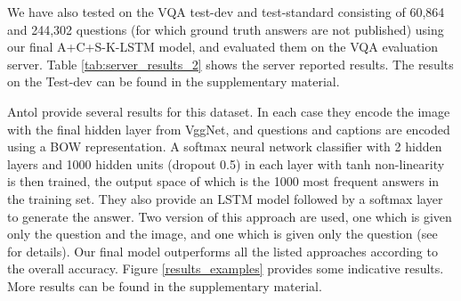 We have also tested on the VQA test-dev and test-standard consisting of 60,864 and 244,302 questions (for which ground truth answers are not published) using our final A+C+S-K-LSTM model, and evaluated them on the VQA evaluation server. Table \ref{tab:server_results_2} shows the server reported results. The results on the Test-dev can be found in the supplementary material.

Antol \etal \cite{antol2015vqa} provide several results for this dataset. In each case they encode the image with the final hidden layer from VggNet, and questions and captions are encoded using a BOW representation. A softmax neural network classifier with 2 hidden layers and 1000 hidden units (dropout 0.5) in each layer with tanh non-linearity is then trained, the output space of which is the 1000 most frequent answers in the training set. They also provide an LSTM model followed by a softmax layer to generate the answer. Two version of this approach are used, one which is given only the question and the image, and one which is given only the question (see~\cite{antol2015vqa} for details). %
Our final model outperforms all the listed approaches according to the overall accuracy. Figure \ref{results_examples} provides some indicative results. More results can be found in the supplementary material.

%

